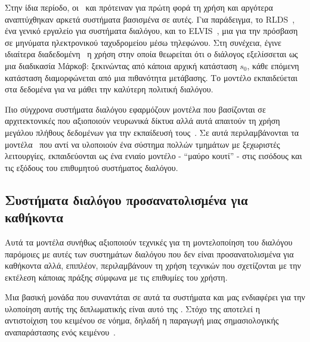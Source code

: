 Στην ίδια περίοδο, οι~\citet{levin1997stochastic} και \citet{levin1998using} πρότειναν για πρώτη φορά τη χρήση 
και αργότερα αναπτύχθηκαν αρκετά συστήματα βασισμένα σε αυτές.
Για παράδειγμα, το RLDS~\cite{singh2000reinforcement}, ένα γενικό εργαλείο για συστήματα διαλόγου,
και το ELVIS~\cite{walker1998learning}, μια  για την πρόσβαση σε μηνύματα ηλεκτρονικού ταχυδρομείου μέσω τηλεφώνου.
Στη συνέχεια, έγινε ιδιαίτερα διαδεδομένη~\cite{young2013pomdp,wang2016recent,roy2000spoken,young2002talking} η χρήση
στην οποία θεωρείται ότι ο διάλογος εξελίσσεται ως μια διαδικασία Μάρκοβ: ξεκινώντας από κάποια αρχική κατάσταση $s_0$, κάθε επόμενη κατάσταση διαμορφώνεται από μια πιθανότητα μετάβασης.
Το μοντέλο εκπαιδεύεται στα δεδομένα για να μάθει την καλύτερη πολιτική διαλόγου.

Πιο σύγχρονα συστήματα διαλόγου εφαρμόζουν μοντέλα που βασίζονται σε αρχιτεκτονικές που αξιοποιούν νευρωνικά δίκτυα αλλά αυτά απαιτούν τη χρήση μεγάλου πλήθους δεδομένων για την εκπαίδευσή τους~\cite{serban2015survey}.
Σε αυτά περιλαμβάνονται τα  μοντέλα~\cite{serban2015survey,serban2016building}
που αντί να υλοποιούν ένα σύστημα πολλών τμημάτων με ξεχωριστές λειτουργίες,
εκπαιδεύονται ως ένα ενιαίο μοντέλο - \enquote{μαύρο κουτί} - στις εισόδους και τις εξόδους του επιθυμητού συστήματος διαλόγου.

\subsection{Συστήματα διαλόγου προσανατολισμένα για καθήκοντα}\label{subsec:goal-driven-dialogue-systems}%
Αυτά τα μοντέλα συνήθως αξιοποιούν τεχνικές για τη μοντελοποίηση του διαλόγου παρόμοιες με αυτές των συστημάτων διαλόγου που δεν είναι προσανατολισμένα για καθήκοντα αλλά,
επιπλέον, περιλαμβάνουν τη χρήση τεχνικών που σχετίζονται με την εκτέλεση κάποιας πράξης σύμφωνα με τις επιθυμίες του χρήστη.

Μια βασική μονάδα που συναντάται σε αυτά τα συστήματα και μας ενδιαφέρει για την υλοποίηση αυτής της διπλωματικής είναι αυτό της
.
Στόχο της αποτελεί η αντιστοίχιση του κειμένου σε νόημα, δηλαδή η παραγωγή μιας σημασιολογικής αναπαράστασης ενός κειμένου~\cite{martin2009speech}.

